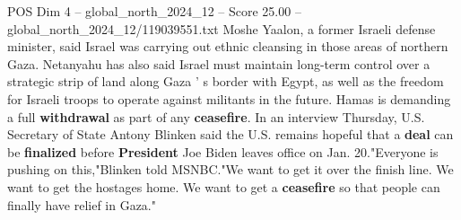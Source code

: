 \begin{textsample}{POS Dim 4 – global\_north\_2024\_12 – Score 25.00 – global\_north\_2024\_12/119039551.txt}
Moshe Yaalon, a former Israeli defense minister, said Israel was carrying out ethnic cleansing in those areas of northern Gaza.
Netanyahu has also said Israel must maintain long-term control over a strategic strip of land along Gaza ' s border with Egypt, as well as the freedom for Israeli troops to operate against militants in the future.
Hamas is demanding a full \textbf{withdrawal} as part of any \textbf{ceasefire}.
In an interview Thursday, U.S.
Secretary of State Antony Blinken said the U.S. remains hopeful that a \textbf{deal} can be \textbf{finalized} before \textbf{President} Joe Biden leaves office on Jan. 20."Everyone is pushing on this,"Blinken told MSNBC."We want to get it over the finish line.
We want to get the hostages home.
We want to get a \textbf{ceasefire} so that people can finally have relief in Gaza."

\end{textsample}
